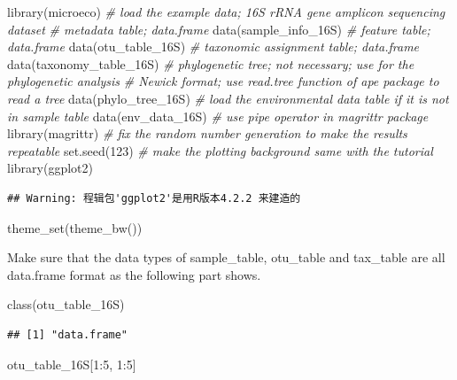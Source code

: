 \documentclass[
]{book}
\newenvironment{Shaded}{\begin{snugshade}}{\end{snugshade}}
\newcommand{\CommentTok}[1]{\textcolor[rgb]{0.56,0.35,0.01}{\textit{#1}}}
\newcommand{\DecValTok}[1]{\textcolor[rgb]{0.00,0.00,0.81}{#1}}
\newcommand{\FunctionTok}[1]{\textcolor[rgb]{0.00,0.00,0.00}{#1}}
\newcommand{\NormalTok}[1]{#1}
\newcommand{\SpecialCharTok}[1]{\textcolor[rgb]{0.00,0.00,0.00}{#1}}
\begin{document}
\begin{Shaded}
\begin{Highlighting}[]
\FunctionTok{library}\NormalTok{(microeco)}
\CommentTok{\# load the example data; 16S rRNA gene amplicon sequencing dataset}
\CommentTok{\# metadata table; data.frame}
\FunctionTok{data}\NormalTok{(sample\_info\_16S)}
\CommentTok{\# feature table; data.frame}
\FunctionTok{data}\NormalTok{(otu\_table\_16S)}
\CommentTok{\# taxonomic assignment table; data.frame}
\FunctionTok{data}\NormalTok{(taxonomy\_table\_16S)}
\CommentTok{\# phylogenetic tree; not necessary; use for the phylogenetic analysis}
\CommentTok{\# Newick format; use read.tree function of ape package to read a tree}
\FunctionTok{data}\NormalTok{(phylo\_tree\_16S)}
\CommentTok{\# load the environmental data table if it is not in sample table}
\FunctionTok{data}\NormalTok{(env\_data\_16S)}
\CommentTok{\# use pipe operator in magrittr package}
\FunctionTok{library}\NormalTok{(magrittr)}
\CommentTok{\# fix the random number generation to make the results repeatable}
\FunctionTok{set.seed}\NormalTok{(}\DecValTok{123}\NormalTok{)}
\CommentTok{\# make the plotting background same with the tutorial}
\FunctionTok{library}\NormalTok{(ggplot2)}
\end{Highlighting}
\end{Shaded}

\begin{verbatim}
## Warning: 程辑包'ggplot2'是用R版本4.2.2 来建造的
\end{verbatim}

\begin{Shaded}
\begin{Highlighting}[]
\FunctionTok{theme\_set}\NormalTok{(}\FunctionTok{theme\_bw}\NormalTok{())}
\end{Highlighting}
\end{Shaded}

Make sure that the data types of sample\_table, otu\_table and tax\_table are all data.frame format as the following part shows.

\begin{Shaded}
\begin{Highlighting}[]
\FunctionTok{class}\NormalTok{(otu\_table\_16S)}
\end{Highlighting}
\end{Shaded}

\begin{verbatim}
## [1] "data.frame"
\end{verbatim}

\begin{Shaded}
\begin{Highlighting}[]
\NormalTok{otu\_table\_16S[}\DecValTok{1}\SpecialCharTok{:}\DecValTok{5}\NormalTok{, }\DecValTok{1}\SpecialCharTok{:}\DecValTok{5}\NormalTok{]}
\end{Highlighting}
\end{Shaded}
\end{document}
